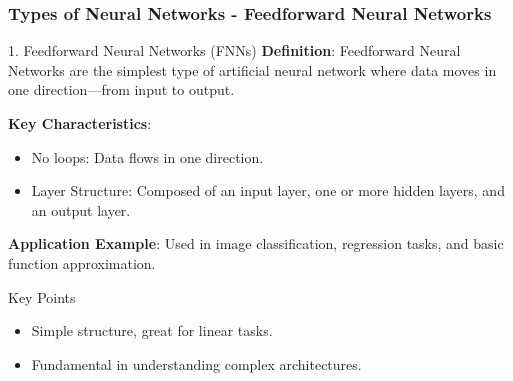 \documentclass[aspectratio=169]{beamer}
\begin{document}
\begin{frame}[fragile]
    \frametitle{Types of Neural Networks - Feedforward Neural Networks}
    \begin{block}{1. Feedforward Neural Networks (FNNs)}
        \textbf{Definition}:
        Feedforward Neural Networks are the simplest type of artificial neural network where data moves in one direction—from input to output.

        \textbf{Key Characteristics}:
        \begin{itemize}
            \item No loops: Data flows in one direction.
            \item Layer Structure: Composed of an input layer, one or more hidden layers, and an output layer.
        \end{itemize}
        
        \textbf{Application Example}:
        Used in image classification, regression tasks, and basic function approximation.
    \end{block}
    \begin{block}{Key Points}
        \begin{itemize}
            \item Simple structure, great for linear tasks.
            \item Fundamental in understanding complex architectures.
        \end{itemize}
    \end{block}
\end{frame}
\end{document}

